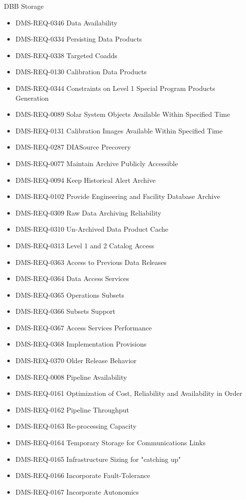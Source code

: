 DBB Storage \begin{itemize}
\item DMS-REQ-0346 Data Availability
\item DMS-REQ-0334 Persisting Data Products
\item DMS-REQ-0338 Targeted Coadds
\item DMS-REQ-0130 Calibration Data Products
\item DMS-REQ-0344 Constraints on Level 1 Special Program Products Generation
\item DMS-REQ-0089 Solar System Objects Available Within Specified Time
\item DMS-REQ-0131 Calibration Images Available Within Specified Time
\item DMS-REQ-0287 DIASource Precovery
\item DMS-REQ-0077 Maintain Archive Publicly Accessible
\item DMS-REQ-0094 Keep Historical Alert Archive
\item DMS-REQ-0102 Provide Engineering and Facility Database Archive
\item DMS-REQ-0309 Raw Data Archiving Reliability
\item DMS-REQ-0310 Un-Archived Data Product Cache
\item DMS-REQ-0313 Level 1 and 2 Catalog Access
\item DMS-REQ-0363 Access to Previous Data Releases
\item DMS-REQ-0364 Data Access Services
\item DMS-REQ-0365 Operations Subsets
\item DMS-REQ-0366 Subsets Support
\item DMS-REQ-0367 Access Services Performance
\item DMS-REQ-0368 Implementation Provisions
\item DMS-REQ-0370 Older Release Behavior
\item DMS-REQ-0008 Pipeline Availability
\item DMS-REQ-0161 Optimization of Cost, Reliability and Availability in Order
\item DMS-REQ-0162 Pipeline Throughput
\item DMS-REQ-0163 Re-processing Capacity
\item DMS-REQ-0164 Temporary Storage for Communications Links
\item DMS-REQ-0165 Infrastructure Sizing for "catching up"
\item DMS-REQ-0166 Incorporate Fault-Tolerance
\item DMS-REQ-0167 Incorporate Autonomics

\end{itemize}
